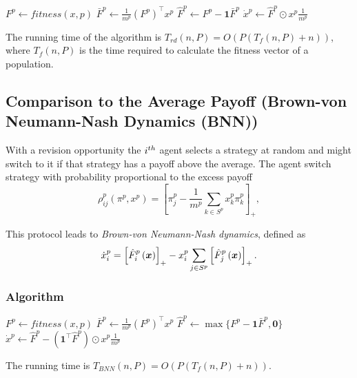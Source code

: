 \begin{algorithm}[H]

 \BlankLine
 
  {
  $ F^p \leftarrow fitness(x, p)$\;
  $ \bar{F}^p \leftarrow \frac{1}{m^p} (F^p)^\top x^p$\;
  $ \hat{F}^p \leftarrow F^p - \boldsymbol{1} \bar{F}^p$\;
  $ \dot{x}^p \leftarrow \hat{F}^p \odot x^p \frac{1}{m^p} $\; 
 }
\end{algorithm}
%
The running time of the algorithm is $T_{rd}(n, P) = O( P (  T_{f}(n,P) + n) ) $, where $T_{f}(n,P)$ is the time required to calculate the fitness vector of a population.








\subsection{Comparison to the Average Payoff (Brown-von Neumann-Nash Dynamics (BNN))}

With a revision opportunity the $i^{th}$ agent selects a strategy at random and might switch to it if that strategy has a payoff above the average. The agent switch strategy with probability proportional to the excess payoff
%
\begin{equation}
\rho_{ij}^p(\pi^p, x^p) = \left[ \pi_j^p - \frac{1}{m^p} \sum_{k\in S^p} x_k^p \pi_k^p \right]_+,
\end{equation}

This protocol leads to \emph{Brown-von Neumann-Nash dynamics}, defined as 
\begin{equation}\label{eq:bnn}
 \dot{x}_i^p = \left[ \hat{F}_i^p \left( \boldsymbol{x} \right) \right]_+ - x_i^p  \sum_{j \in S^p} \left[ \hat{F}_j^p \left( \boldsymbol{x} \right) \right]_+.
\end{equation}



\subsubsection*{Algorithm}

\begin{algorithm}[H]

 \BlankLine
 
  {
  $ F^p \leftarrow fitness(x, p)$\;
  $ \bar{F}^p \leftarrow \frac{1}{m^p} (F^p)^\top x^p$\;
  $ \hat{F}^p \leftarrow \max\{F^p - \boldsymbol{1} \bar{F}^p, \boldsymbol{0}\}$\;
  $ \dot{x}^p \leftarrow \hat{F}^p - (\boldsymbol{1}^\top \hat{F}^p) \odot x^p \frac{1}{m^p} $\;
 }
\end{algorithm}
%
The running time is $T_{BNN}(n,P) = O( P (  T_{f}(n,P) + n) ) $.






